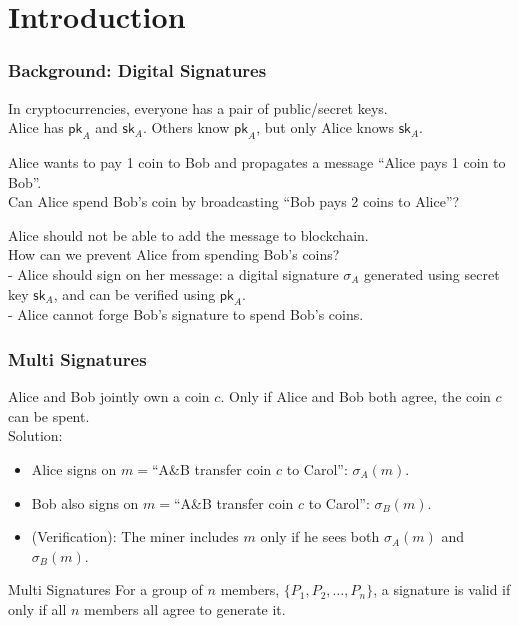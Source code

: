 
\section{Introduction}

\begin{frame}
\frametitle{Background: Digital Signatures}

In cryptocurrencies, everyone has a pair of public/secret keys. \\
Alice has $\mathsf{pk}_A$ and $\mathsf{sk}_A$.  Others know $\mathsf{pk}_A$, but only Alice knows $\mathsf{sk}_A$. \\
\begin{examples}
    Alice wants to pay 1 coin to Bob and propagates a message ``Alice pays 1 coin to Bob''. \\
    Can Alice spend Bob's coin by broadcasting ``Bob pays 2 coins to Alice''? \\
\end{examples}
\pause
Alice should not be able to add the message to blockchain. \\ \pause
\vspace{1em}
How can we prevent Alice from spending Bob's coins? \\ \pause
- Alice should sign on her message: a digital signature $\sigma_A$ generated using secret key $\mathsf{sk}_A$, and can be verified using $\mathsf{pk}_A$. \\ \pause
- Alice cannot forge Bob's signature to spend Bob's coins. 

\end{frame}



\begin{frame}
    \frametitle{Multi Signatures}
    Alice and Bob jointly own a coin $c$. Only if Alice and Bob both agree, the coin $c$ can be spent. \\ \pause
    Solution: 
    \begin{itemize}
        \item Alice signs on $m=$``A\&B transfer coin $c$ to Carol'': $\sigma_A(m)$. 
        \item Bob also signs on $m=$``A\&B transfer coin $c$ to Carol'': $\sigma_B(m)$. 
        \item (Verification): The miner includes $m$ only if he sees both $\sigma_A(m)$ and $\sigma_B(m)$. 
    \end{itemize}
    \begin{block}{Multi Signatures} 
        For a group of $n$ members, $\{P_1, P_2,\dots, P_n\}$, a signature is valid if only if all $n$ members all agree to generate it.  
    \end{block}
    \end{frame}
    
